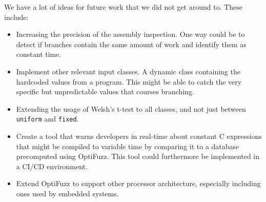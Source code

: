 

We have a lot of ideas for future work that we did not get around to. These include:
\begin{itemize}
    \setlength\itemsep{-0.6em}
    \item Increasing the precision of the assembly inspection. One way could be to detect if branches contain the same amount of work and identify them as constant time.
    \item Implement other relevant input classes. A dynamic class containing the hardcoded values from a program. This might be able to catch the very specific but unpredictable values that courses branching.
    \item Extending the usage of Welsh's t-test to all classes, and not just between \texttt{uniform} and \texttt{fixed}.
    \item Create a tool that warns developers in real-time about constant C expressions that might be compiled to variable time by comparing it to a database precomputed using OptiFuzz. This tool could furthermore be implemented in a CI/CD environment.
    \item Extend OptiFuzz to support other processor architecture, especially including ones used by embedded systems.
\end{itemize}
